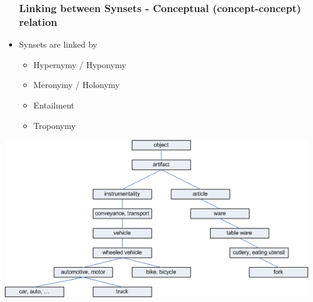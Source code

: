 \begin{frame}
\begin{minipage}{0.40\textwidth}
\begin{itemize}
\frametitle{Linking between Synsets - Conceptual (concept-concept) relation}
\item Synsets are linked by
\begin{itemize}
\item Hypernymy / Hyponymy
\item Meronymy / Holonymy 
\item Entailment 
\item Troponymy
\end{itemize}
\end{itemize}
\end{minipage}
\begin{minipage}{0.5\textwidth}
\includegraphics[scale=0.33]{img/wordnet_hyponym.png}
\end{minipage}
\end{frame}

